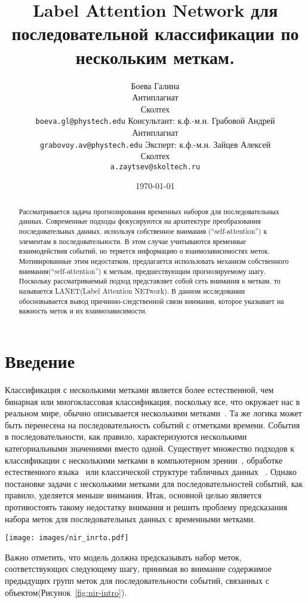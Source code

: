 \documentclass[a4paper, 12pt]{article} %
\title{Label Attention Network для последовательной классификации по нескольким меткам.}
\author{ Боева Галина\\
	Антиплагиат\\
	Сколтех\\ 
	\texttt{boeva.gl@phystech.edu} 
	\AND
        Консультант: к.ф.-м.н. Грабовой Андрей\\
	Антиплагиат\\
	\texttt{grabovoy.av@phystech.edu} 
        \AND
        Эксперт: к.ф.-м.н. Зайцев Алексей\\
	Сколтех\\
	\texttt{a.zaytsev@skoltech.ru}
}
\date{\today}
\begin{document}
\maketitle

\begin{abstract}
Рассматривается задача прогнозирования временных наборов для последовательных данных. Современные подходы фокусируются на архитектуре преобразования последовательных данных, используя собственное внимания (``self-attention'') к элементам в последовательности. В этом случае учитываются временные взаимодействия событий, но теряется информацию о взаимозависимостях меток. Мотивированные этим недостатком, предлагается использовать механизм собственного внимания(``self-attention'') к меткам, предшествующим прогнозируемому шагу. Поскольку рассматриваемый подход представляет собой сеть внимания к меткам, то называется LANET(Label Attention NETwork). В данном исследовании обосновывается вывод причинно-следственной связи внимания, которое указывает на важность меток и их взаимозависимости.
\end{abstract}



\section{Введение}
Классификация с несколькими метками является более естественной, чем бинарная или многоклассовая классификация, поскольку все, что окружает нас в реальном мире, обычно описывается несколькими метками~\cite{liu2021emerging}. Та же логика может быть перенесена на последовательность событий с отметками времени. События в последовательности, как правило, характеризуются несколькими категориальными значениями вместо одной. Существует множество подходов к классификации с несколькими метками в компьютерном зрении~\cite{durand2019learning}, обработке естественного языка~\cite{xiao2019label} или классической структуре табличных данных ~\cite{tarekegn2021review}. Однако постановке задачи с несколькими метками для последовательностей событий, как правило, уделяется меньше внимания. Итак, основной целью является противостоять такому недостатку внимания и решить проблему предсказания набора меток для последовательных данных с временными метками.  
\begin{figure*}
    \centering
    \texttt{[image: images/nir\_inrto.pdf]}
    \caption{На рисунке показано визуальное представление постановки задачи. Наша модель должна предсказать метки для момента времени $t_4$, учитывая историю предыдущих наборов меток. Требуется предсказать несколько меток, так что это определение задачи классификации с несколькими метками.}
    \label{fig:nir-intro}
\end{figure*}
Важно отметить, что модель должна предсказывать набор меток, соответствующих следующему шагу, принимая во внимание содержимое предыдущих групп меток для последовательности событий, связанных с объектом(Рисунок~\ref{fig:nir-intro}).
\end{document}
